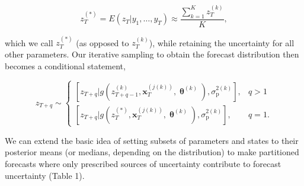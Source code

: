\documentclass[12pt,]{article}
\begin{document}
\begin{equation}
z_{T}^{(*)} = E(z_{T} | y_1,\dots,y_T) \approx \frac{\sum^K_{k=1} z_{T}^{(k)}}{K},
\end{equation}

\noindent{}which we call \(z^{(*)}_T\) (as opposed to \(z^{(k)}_T\)),
while retaining the uncertainty for all other parameters. Our iterative
sampling to obtain the forecast distribution then becomes a conditional
statement,

\begin{equation}
    z_{T+q} \sim 
\begin{cases}
    \left[z_{T+q} | g(z_{T+q-1}^{(k)}, \textbf{x}_T^{(j(k))}, \bm{\uptheta}^{(k)}), \sigma^{2(k)}_{\text{p}} \right], &q>1 \\
    \left[z_{T+q} | g(z_{T}^{(*)}, \textbf{x}_T^{(j(k))}, \bm{\uptheta}^{(k)}), \sigma^{2(k)}_{\text{p}} \right], &q=1.
\end{cases}
\end{equation}

\noindent{}We can extend the basic idea of setting subsets of parameters
and states to their posterior means (or medians, depending on the
distribution) to make partitioned forecasts where only prescribed
sources of uncertainty contribute to forecast uncertainty (Table 1).

\renewcommand{\arraystretch}{1.6}
\end{document}
